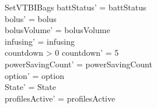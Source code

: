 \begin{schema}{SetVTBIBags}
	battStatus' = battStatus\\
	bolus' = bolus\\
	bolusVolume' = bolusVolume\\
	\pagebreak
	infusing' = infusing\\
	countdown > 0 \land countdown' = 5\\
	powerSavingCount' = powerSavingCount\\ 
	option' = option\\
	State' = State\\
	profilesActive' = profilesActive
\end{schema}

